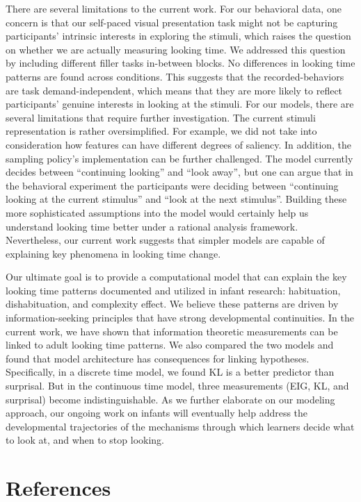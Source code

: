 \documentclass[10pt, letterpaper]{article}
\begin{document}
There are several limitations to the current work. For our behavioral
data, one concern is that our self-paced visual presentation task might
not be capturing participants' intrinsic interests in exploring the
stimuli, which raises the question on whether we are actually measuring
looking time. We addressed this question by including different filler
tasks in-between blocks. No differences in looking time patterns are
found across conditions. This suggests that the recorded-behaviors are
task demand-independent, which means that they are more likely to
reflect participants' genuine interests in looking at the stimuli. For
our models, there are several limitations that require further
investigation. The current stimuli representation is rather
oversimplified. For example, we did not take into consideration how
features can have different degrees of saliency. In addition, the
sampling policy's implementation can be further challenged. The model
currently decides between ``continuing looking'' and ``look away'', but
one can argue that in the behavioral experiment the participants were
deciding between ``continuing looking at the current stimulus'' and
``look at the next stimulus''. Building these more sophisticated
assumptions into the model would certainly help us understand looking
time better under a rational analysis framework. Nevertheless, our
current work suggests that simpler models are capable of explaining key
phenomena in looking time change.

Our ultimate goal is to provide a computational model that can explain
the key looking time patterns documented and utilized in infant
research: habituation, dishabituation, and complexity effect. We believe
these patterns are driven by information-seeking principles that have
strong developmental continuities. In the current work, we have shown
that information theoretic measurements can be linked to adult looking
time patterns. We also compared the two models and found that model
architecture has consequences for linking hypotheses. Specifically, in a
discrete time model, we found KL is a better predictor than surprisal.
But in the continuous time model, three measurements (EIG, KL, and
surprisal) become indistinguishable. As we further elaborate on our
modeling approach, our ongoing work on infants will eventually help
address the developmental trajectories of the mechanisms through which
learners decide what to look at, and when to stop looking.

\hypertarget{references}{%
\section{References}\label{references}}
\end{document}
